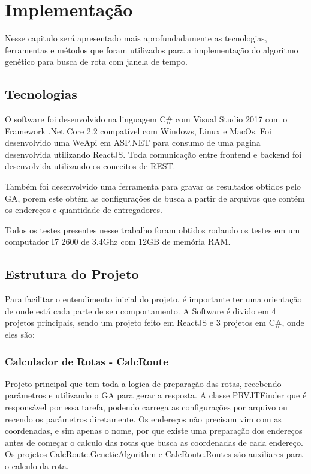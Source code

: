 \chapter{Implementação}
 
Nesse capitulo será apresentado mais aprofundadamente as tecnologias, ferramentas e métodos que foram utilizados para a implementação do algoritmo genético para busca de rota com janela de tempo.

\section{Tecnologias}

O software foi desenvolvido na linguagem C\# com Visual Studio 2017 com o Framework  .Net Core 2.2 compatível com Windows, Linux e MacOs.
Foi desenvolvido uma WeApi em ASP.NET para consumo de uma pagina desenvolvida utilizando  ReactJS. Toda comunicação entre frontend e backend foi desenvolvida utilizando os conceitos de REST.

Também foi desenvolvido uma ferramenta para gravar os resultados obtidos pelo GA, porem este obtém as configurações de busca a partir de arquivos que contém os endereços e quantidade de entregadores.

Todos os testes presentes nesse trabalho foram obtidos rodando os testes em um computador I7 2600 de 3.4Ghz com 12GB de memória RAM.


\section{Estrutura do Projeto}

Para facilitar o entendimento inicial do projeto, é importante ter uma orientação de onde está cada parte de seu comportamento. A Software é divido em 4 projetos principais, sendo um projeto feito em ReactJS e 3  projetos em C\#, onde eles são:

\subsection{Calculador de Rotas - CalcRoute}

Projeto principal que tem toda a logica de preparação das rotas, recebendo parâmetros e utilizando o GA para gerar a resposta.
A classe PRVJTFinder que é responsável por essa tarefa, podendo carrega as configurações por arquivo ou recendo os parâmetros diretamente. Os endereços não precisam vim com as coordenadas, e sim apenas o nome, por que existe uma preparação dos endereços antes de começar o calculo das rotas que busca as coordenadas de cada endereço. Os projetos CalcRoute.GeneticAlgorithm e CalcRoute.Routes são auxiliares para o calculo da rota.

